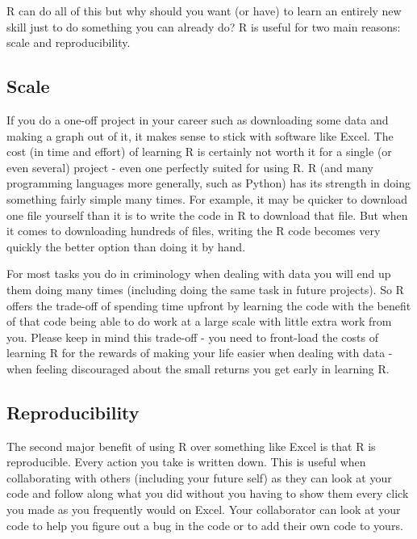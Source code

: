 \documentclass[
  12pt,
]{book}
\begin{document}
R can do all of this but why should you want (or have) to learn an entirely new skill just to do something you can already do? R is useful for two main reasons: scale and reproducibility.

\hypertarget{scale}{%
\subsection*{Scale}\label{scale}}


If you do a one-off project in your career such as downloading some data and making a graph out of it, it makes sense to stick with software like Excel. The cost (in time and effort) of learning R is certainly not worth it for a single (or even several) project - even one perfectly suited for using R. R (and many programming languages more generally, such as Python) has its strength in doing something fairly simple many times. For example, it may be quicker to download one file yourself than it is to write the code in R to download that file. But when it comes to downloading hundreds of files, writing the R code becomes very quickly the better option than doing it by hand.

For most tasks you do in criminology when dealing with data you will end up them doing many times (including doing the same task in future projects). So R offers the trade-off of spending time upfront by learning the code with the benefit of that code being able to do work at a large scale with little extra work from you. Please keep in mind this trade-off - you need to front-load the costs of learning R for the rewards of making your life easier when dealing with data - when feeling discouraged about the small returns you get early in learning R.

\hypertarget{reproducibility}{%
\subsection*{Reproducibility}\label{reproducibility}}


The second major benefit of using R over something like Excel is that R is reproducible. Every action you take is written down. This is useful when collaborating with others (including your future self) as they can look at your code and follow along what you did without you having to show them every click you made as you frequently would on Excel. Your collaborator can look at your code to help you figure out a bug in the code or to add their own code to yours.
\end{document}
